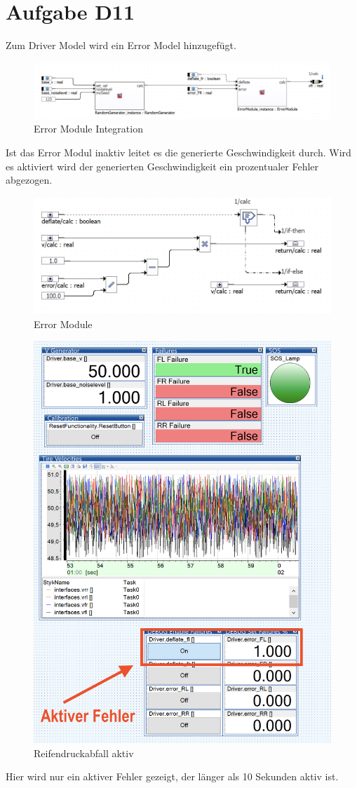 
\chapter{Aufgabe D11}
Zum Driver Model wird ein Error Model hinzugefügt.
\begin{figure}[H]
	\centering
	\includegraphics[width=1\linewidth]{../Graphiken/Errorintegration.png}
	\caption{Error Module Integration}
	\label{fig:ErrorModuleIntegration}
\end{figure}
Ist das Error Modul inaktiv leitet es die generierte Geschwindigkeit durch. Wird es aktiviert wird der generierten Geschwindigkeit ein prozentualer Fehler abgezogen.
\begin{figure}[H]
	\centering
	\includegraphics[width=0.85\linewidth]{../Graphiken/ErrorModule.png}
	\caption{Error Module}
	\label{fig:ErrorModule}
\end{figure}

\begin{figure}[H]
	\centering
\includegraphics[width=0.85\linewidth]{../Graphiken/aktiveError.png}
\caption{Reifendruckabfall aktiv}
\label{fig:ErrorModule}
\end{figure}
Hier wird nur ein aktiver Fehler gezeigt, der länger als 10 Sekunden aktiv ist.